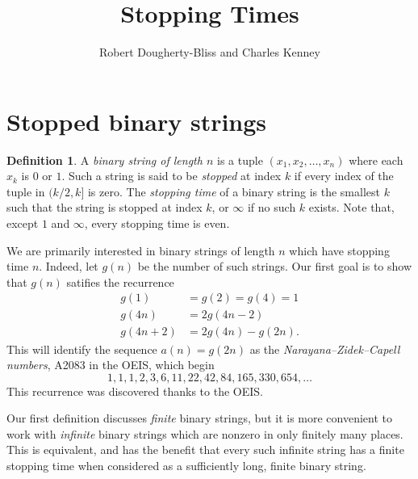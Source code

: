 \documentclass[12pt]{amsart}
\title{Stopping Times}
\author{Robert Dougherty-Bliss and Charles Kenney}
\theoremstyle{definition}
\newtheorem{definition}{Definition}
\begin{document}
\maketitle

\section{Stopped binary strings}%
\label{sec:stopped_binary_strings}

\begin{definition}
    A \emph{binary string of length $n$} is a tuple $(x_1, x_2, \dots, x_n)$
    where each $x_k$ is $0$ or $1$. Such a string is said to be \emph{stopped}
    at index $k$ if every index of the tuple in $(k / 2, k]$ is zero. The
    \emph{stopping time} of a binary string is the smallest $k$ such that the
    string is stopped at index $k$, or $\infty$ if no such $k$ exists. Note
    that, except $1$ and $\infty$, every stopping time is even.
\end{definition}

We are primarily interested in binary strings of length $n$ which have stopping
time $n$. Indeed, let $g(n)$ be the number of such strings. Our first goal is
to show that $g(n)$ satifies the recurrence
\begin{align*}
    g(1) &= g(2) = g(4) = 1 \\
    g(4n) &= 2 g(4n - 2) \\
    g(4n + 2) &= 2 g(4n) - g(2n).
\end{align*}
This will identify the sequence $a(n) = g(2n)$ as the
\emph{Narayana--Zidek--Capell numbers}, A2083 in the OEIS, which begin
\begin{equation*}
    1, 1, 1, 2, 3, 6, 11, 22, 42, 84, 165, 330, 654, \dots
\end{equation*}
This recurrence was discovered thanks to the OEIS.

Our first definition discusses \emph{finite} binary strings, but it is more
convenient to work with \emph{infinite} binary strings which are nonzero in
only finitely many places. This is equivalent, and has the benefit that every
such infinite string has a finite stopping time when considered as a
sufficiently long, finite binary string.
\end{document}
